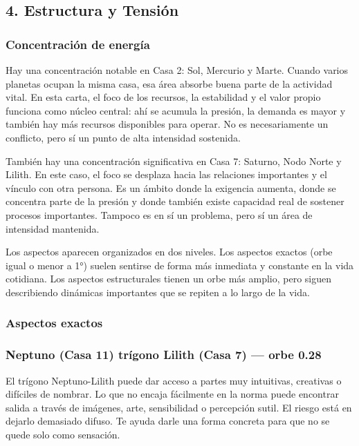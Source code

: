 \documentclass[11pt,a4paper]{article}\usepackage[utf8]{inputenc}
\begin{document}
\vspace{0.8cm}

\subsection{4. Estructura y Tensión}

\subsubsection*{Concentración de energía}

Hay una concentración notable en Casa 2: Sol, Mercurio y Marte. Cuando varios planetas ocupan la misma casa, esa área absorbe buena parte de la actividad vital. En esta carta, el foco de los recursos, la estabilidad y el valor propio funciona como núcleo central: ahí se acumula la presión, la demanda es mayor y también hay más recursos disponibles para operar. No es necesariamente un conflicto, pero sí un punto de alta intensidad sostenida.

También hay una concentración significativa en Casa 7: Saturno, Nodo Norte y Lilith. En este caso, el foco se desplaza hacia las relaciones importantes y el vínculo con otra persona. Es un ámbito donde la exigencia aumenta, donde se concentra parte de la presión y donde también existe capacidad real de sostener procesos importantes. Tampoco es en sí un problema, pero sí un área de intensidad mantenida.



Los aspectos aparecen organizados en dos niveles. Los aspectos exactos (orbe igual o menor a 1°) suelen sentirse de forma más inmediata y constante en la vida cotidiana. Los aspectos estructurales tienen un orbe más amplio, pero siguen describiendo dinámicas importantes que se repiten a lo largo de la vida.



\vspace{0.8cm}
\subsubsection*{Aspectos exactos}
\subsubsection*{Neptuno (Casa 11) trígono Lilith (Casa 7) --- orbe 0.28\textdegree}
El trígono Neptuno-Lilith puede dar acceso a partes muy intuitivas, creativas o difíciles de nombrar. Lo que no encaja fácilmente en la norma puede encontrar salida a través de imágenes, arte, sensibilidad o percepción sutil. El riesgo está en dejarlo demasiado difuso. Te ayuda darle una forma concreta para que no se quede solo como sensación.
\end{document}
